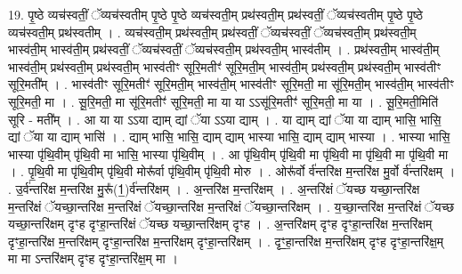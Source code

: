 \documentclass[17pt]{extarticle}
\begin{document}
19. पृ॒ष्ठे व्यच॑स्वतीं॒ ॅव्यच॑स्वतीम् पृ॒ष्ठे पृ॒ष्ठे व्यच॑स्वती॒म् प्रथ॑स्वती॒म् प्रथ॑स्वतीं॒ ॅव्यच॑स्वतीम् पृ॒ष्ठे पृ॒ष्ठे व्यच॑स्वती॒म् प्रथ॑स्वतीम् । . व्यच॑स्वती॒म् प्रथ॑स्वती॒म् प्रथ॑स्वतीं॒ ॅव्यच॑स्वतीं॒ ॅव्यच॑स्वती॒म् प्रथ॑स्वती॒म् भास्व॑ती॒म् भास्व॑ती॒म् प्रथ॑स्वतीं॒ ॅव्यच॑स्वतीं॒ ॅव्यच॑स्वती॒म् प्रथ॑स्वती॒म् भास्व॑तीम् । . प्रथ॑स्वती॒म् भास्व॑ती॒म् भास्व॑ती॒म् प्रथ॑स्वती॒म् प्रथ॑स्वती॒म् भास्व॑तीꣳ सूरि॒मतीꣳ॑ सूरि॒मती॒म् भास्व॑ती॒म् प्रथ॑स्वती॒म् प्रथ॑स्वती॒म् भास्व॑तीꣳ सूरि॒मती᳚म् । . भास्व॑तीꣳ सूरि॒मतीꣳ॑ सूरि॒मती॒म् भास्व॑ती॒म् भास्व॑तीꣳ सूरि॒मती॒ मा सू॑रि॒मती॒म् भास्व॑ती॒म् भास्व॑तीꣳ सूरि॒मती॒ मा । . सू॒रि॒मती॒ मा सू॑रि॒मतीꣳ॑ सूरि॒मती॒ मा या या ऽऽसू॑रि॒मतीꣳ॑ सूरि॒मती॒ मा या । . सू॒रि॒मती॒मिति॑ सूरि - मती᳚म् । . आ या या ऽऽया द्याम् द्यां ॅया ऽऽया द्याम् । . या द्याम् द्यां ॅया या द्याम् भासि॒ भासि॒ द्यां ॅया या द्याम् भासि॑ । . द्याम् भासि॒ भासि॒ द्याम् द्याम् भास्या भासि॒ द्याम् द्याम् भास्या । . भास्या भासि॒ भास्या पृ॑थि॒वीम् पृ॑थि॒वी मा भासि॒ भास्या पृ॑थि॒वीम् । . आ पृ॑थि॒वीम् पृ॑थि॒वी मा पृ॑थि॒वी मा पृ॑थि॒वी मा पृ॑थि॒वी मा । . पृ॒थि॒वी मा पृ॑थि॒वीम् पृ॑थि॒वी मोरू᳚र्वा पृ॑थि॒वीम् पृ॑थि॒वी मोरु । . ओरू᳚र्वो र्व॑न्तरि॑क्ष म॒न्तरि॑क्ष मु॒र्वो र्व॑न्तरि॑क्षम् । . उ॒र्व॑न्तरि॑क्ष म॒न्तरि॑क्ष मु॒रू᳚(1॒)र्व॑न्तरि॑क्षम् । . अ॒न्तरि॑क्ष म॒न्तरि॑क्षम् । . अ॒न्तरि॑क्षं ॅयच्छ यच्छा॒न्तरि॑क्ष म॒न्तरि॑क्षं ॅयच्छा॒न्तरि॑क्ष म॒न्तरि॑क्षं ॅयच्छा॒न्तरि॑क्ष म॒न्तरि॑क्षं ॅयच्छा॒न्तरि॑क्षम् । . य॒च्छा॒न्तरि॑क्ष म॒न्तरि॑क्षं ॅयच्छ यच्छा॒न्तरि॑क्षम् दृꣳह दृꣳहा॒न्तरि॑क्षं ॅयच्छ यच्छा॒न्तरि॑क्षम् दृꣳह । . अ॒न्तरि॑क्षम् दृꣳह दृꣳहा॒न्तरि॑क्ष म॒न्तरि॑क्षम् दृꣳहा॒न्तरि॑क्ष म॒न्तरि॑क्षम् दृꣳहा॒न्तरि॑क्ष म॒न्तरि॑क्षम् दृꣳहा॒न्तरि॑क्षम् । . दृꣳ॒॒हा॒न्तरि॑क्ष म॒न्तरि॑क्षम् दृꣳह दृꣳहा॒न्तरि॑क्ष॒म् मा मा ऽन्तरि॑क्षम् दृꣳह दृꣳहा॒न्तरि॑क्ष॒म् मा । \newline
\end{document}
